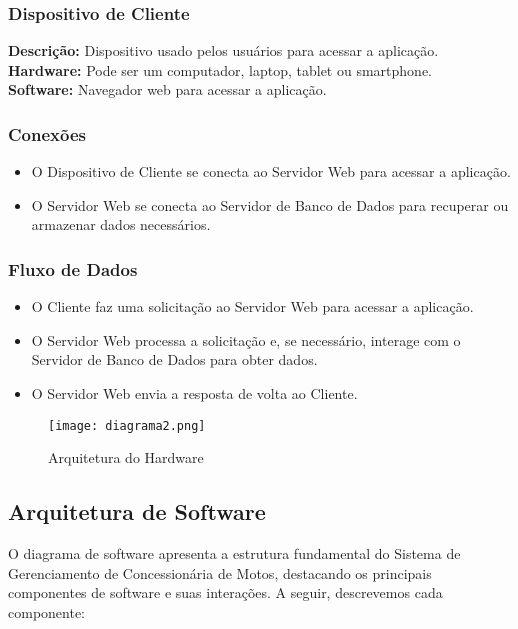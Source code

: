 \subsubsection{Dispositivo de Cliente}

\textbf{Descrição:} Dispositivo usado pelos usuários para acessar a aplicação. \\
\textbf{Hardware:} Pode ser um computador, laptop, tablet ou smartphone. \\
\textbf{Software:} Navegador web para acessar a aplicação.

\subsubsection{Conexões}

\begin{itemize}
	\item O Dispositivo de Cliente se conecta ao Servidor Web para acessar a aplicação.
	\item O Servidor Web se conecta ao Servidor de Banco de Dados para recuperar ou armazenar dados necessários.
\end{itemize}

\subsubsection{Fluxo de Dados}

\begin{itemize}
	\item O Cliente faz uma solicitação ao Servidor Web para acessar a aplicação.
	\item O Servidor Web processa a solicitação e, se necessário, interage com o Servidor de Banco de Dados para obter dados.
	\item O Servidor Web envia a resposta de volta ao Cliente.
\end{itemize}

\begin{figure}[h]
	\centering
	\texttt{[image: diagrama2.png]}
	\caption{Arquitetura do Hardware}
	\label{fig:diagrama1}
\end{figure}


    \subsection{Arquitetura de Software}

O diagrama de software apresenta a estrutura fundamental do Sistema de Gerenciamento de Concessionária de Motos, destacando os principais componentes de software e suas interações. A seguir, descrevemos cada componente:

